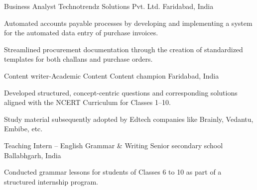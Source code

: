 

\begin{cventries}

  \cventry
    {Business Analyst} %
    {Technotrendz Solutions Pvt. Ltd.} %
    {Faridabad, India} %
    {} %
    {
      \begin{cvitems} %
        \item {Automated accounts payable processes by developing and implementing a system for the automated data entry of purchase invoices.}
        \item {Streamlined procurement documentation through the creation of standardized templates for both challans and purchase orders.}
      \end{cvitems}
    }

  \cventry
    {Content writer-Academic Content} %
    {Content champion} %
    {Faridabad, India} %
    {} %
    {
      \begin{cvitems} %
        \item {Developed structured, concept-centric questions and corresponding solutions aligned with the NCERT Curriculum for Classes 1–10.}
        \item {Study material subsequently adopted by Edtech companies like Brainly, Vedantu, Embibe, etc.}
      \end{cvitems}
    }

  \cventry
    {Teaching Intern – English Grammar \& Writing} %
    {Senior secondary school} %
    {Ballabhgarh, India} %
    {} %
    {
      \begin{cvitems} %
        \item {Conducted grammar lessons for students of Classes 6 to 10 as part of a structured internship program.}
      \end{cvitems}
    }
\end{cventries}
